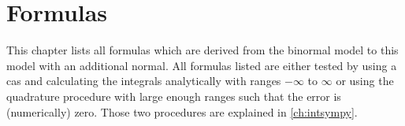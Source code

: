 \chapter{Formulas}\label{ch:formulas}

This chapter lists all formulas which are derived from the binormal model to this model with an additional normal.
All formulas listed are either tested by using a \gls{cas}
and calculating the integrals analytically with ranges $-\infty$ to $\infty$ or
using the quadrature procedure with large enough ranges such that the error is (numerically) zero.
Those two procedures are explained in \cref{ch:intsympy}.





%









